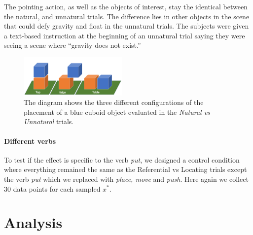 \documentclass[letterpaper]{article} %
\begin{document}
The pointing action, as well as the objects of interest, stay the identical between the natural, and unnatural trials. The difference lies in other objects in the scene that could defy gravity and float in the unnatural trials. The subjects were given a text-based instruction at the beginning of an unnatural trial saying they were seeing a scene where ``gravity does not exist.'' 


\begin{figure}[h!]
    \centering
    \includegraphics[width=0.47\textwidth, trim={0 0 0 0.7in},clip ] {topedgetable.png}
    \caption{
    The diagram shows the three different configurations of the placement of a blue cuboid object evaluated in the \textit{Natural vs Unnatural} trials. 
    }
    \label{fig:topedgetable}
\end{figure}


\paragraph{Different verbs}  
To test if the effect is specific to the verb \textit{put}, we designed a control condition where everything remained the same as the Referential vs Locating trials except the verb \textit{put} which we replaced with \textit{place, move} and \textit{push}. Here again we collect 30 data points for each sampled $x^*$.


\section{Analysis}
\label{analysis}
\end{document}
